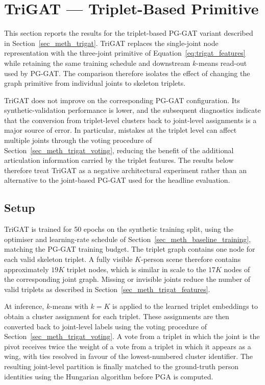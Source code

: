 \section{TriGAT --- Triplet-Based Primitive}
\label{sec_res_trigat}

This section reports the results for the triplet-based PG-GAT variant
described in Section~\ref{sec_meth_trigat}.
TriGAT replaces the single-joint node representation with the three-joint
primitive of Equation~\eqref{eq:trigat_features}
while retaining the same training schedule and downstream $k$-means
read-out used by PG-GAT.
The comparison therefore isolates the effect of changing the graph
primitive from individual joints to skeleton triplets.

TriGAT does not improve on the corresponding PG-GAT configuration.
Its synthetic-validation performance is lower,
and the subsequent diagnostics indicate that the conversion
from triplet-level clusters back to joint-level assignments
is a major source of error.
In particular, mistakes at the triplet level can affect multiple joints
through the voting procedure of Section~\ref{sec_meth_trigat_voting},
reducing the benefit of the additional articulation information carried
by the triplet features.
The results below therefore treat TriGAT as a negative architectural
experiment
rather than an alternative to the joint-based PG-GAT used
for the headline evaluation.

\subsection{Setup}
\label{sec_res_trigat_setup}

TriGAT is trained for 50 epochs on the synthetic training split,
using the optimiser and learning-rate schedule of
Section~\ref{sec_meth_baseline_training},
matching the PG-GAT training budget.
The triplet graph contains one node for each valid skeleton triplet.
A fully visible $K$-person scene therefore contains approximately
$19K$ triplet nodes,
which is similar in scale to the $17K$ nodes of the corresponding
joint graph.
Missing or invisible joints reduce the number of valid triplets
as described in Section~\ref{sec_meth_trigat_features}.

At inference, $k$-means with $k=K$ is applied to the learned triplet
embeddings to obtain a cluster assignment for each triplet.
These assignments are then converted back to joint-level labels
using the voting procedure of Section~\ref{sec_meth_trigat_voting}.
A vote from a triplet in which the joint is the pivot receives twice
the weight of a vote from a triplet in which it appears as a wing,
with ties resolved in favour of the lowest-numbered cluster identifier.
The resulting joint-level partition is finally matched to the
ground-truth person identities using the Hungarian algorithm
before PGA is computed.

